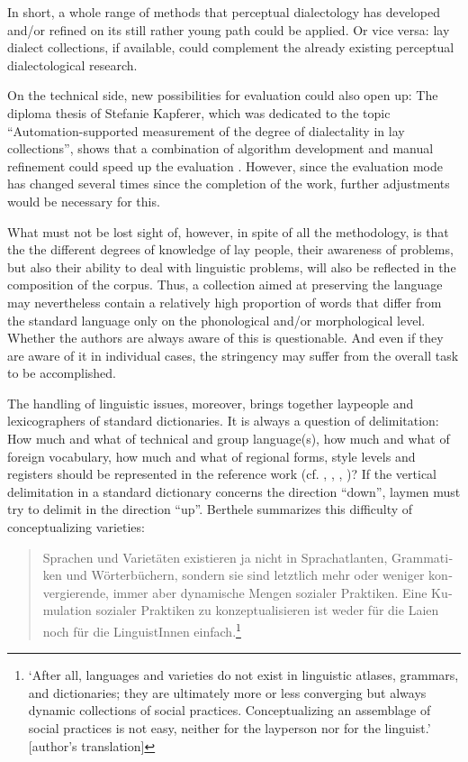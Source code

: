 \documentclass[output=paper]{langscibook}
\begin{document}
In short, a whole range of methods that perceptual dialectology has developed and/or refined on its still rather young path could be applied. Or vice versa: lay dialect collections, if available, could complement the already existing perceptual dialectological research.

\begin{sloppypar}
On the technical side, new possibilities for evaluation could also open up: The diploma thesis of Stefanie Kapferer, which was dedicated to the topic “Automation-supported measurement of the degree of dialectality in lay collections”, shows that a combination of algorithm development and manual refinement could speed up the evaluation \citep{Kapferer2020}. However, since the evaluation mode has changed several times since the completion of the work, further adjustments would be necessary for this. 
\end{sloppypar}

What must not be lost sight of, however, in spite of all the methodology, is that the the different degrees of knowledge of lay people, their awareness of problems, but also their ability to deal with linguistic problems, will also be reflected in the composition of the corpus. Thus, a collection aimed at preserving the language may nevertheless contain a relatively high proportion of words that differ from the standard language only on the phonological and/or morphological level. Whether the authors are always aware of this is questionable. And even if they are aware of it in individual cases, the stringency may suffer from the overall task to be accomplished.

The handling of linguistic issues, moreover, brings together laypeople and lexicographers of standard dictionaries. It is always a question of delimitation: How much and what of technical and group language(s), how much and what of foreign vocabulary, how much and what of regional forms, style levels and registers should be represented in the reference work (cf. \citealt{Bergenholtz1989}, \citealt[21]{Haß-Zumkehr2001}, \citealt{Brückner2006}, \citealt{Lenz2019})? If the vertical delimitation in a standard dictionary concerns the direction “down”, laymen must try to delimit in the direction “up”. Berthele summarizes this difficulty of conceptualizing varieties: 

\begin{quote}
\begin{otherlanguage}{ngerman}
Sprachen und Varietäten existieren ja nicht in Sprachatlanten, Grammatiken und Wörterbüchern, sondern sie sind letztlich mehr oder weniger konvergierende, immer aber dynamische Mengen sozialer Praktiken. Eine Kumulation sozialer Praktiken zu konzeptualisieren ist weder für die Laien noch für die LinguistInnen einfach.\footnote{‘After all, languages and varieties do not exist in linguistic atlases, grammars, and dictionaries; they are ultimately more or less converging but always dynamic collections of social practices. Conceptualizing an assemblage of social practices is not easy, neither for the layperson nor for the linguist.’ [author’s translation]} \citep[264]{Berthele2010}
\end{otherlanguage}
\end{quote}
\end{document}
